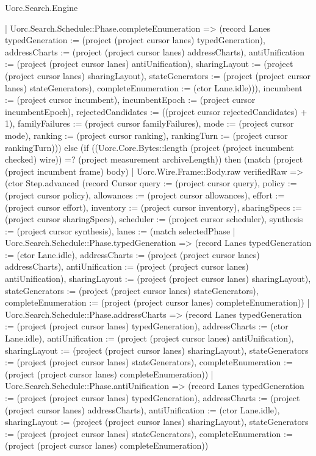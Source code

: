 \begin{lexlean}{Uorc.Search.Engine}
\begin{semanticmodule}
{{          | Uorc.Search.Schedule::Phase.completeEnumeration => (record Lanes {typedGeneration := (project (project cursor lanes) typedGeneration), addressCharts := (project (project cursor lanes) addressCharts), antiUnification := (project (project cursor lanes) antiUnification), sharingLayout := (project (project cursor lanes) sharingLayout), stateGenerators := (project (project cursor lanes) stateGenerators), completeEnumeration := (ctor Lane.idle)})), incumbent := (project cursor incumbent), incumbentEpoch := (project cursor incumbentEpoch), rejectedCandidates := ((project cursor rejectedCandidates) + 1), familyFailures := (project cursor familyFailures), mode := (project cursor mode), ranking := (project cursor ranking), rankingTurn := (project cursor rankingTurn)})) else (if ((Uorc.Core.Bytes::length (project (project incumbent checked) wire)) =? (project measurement archiveLength)) then (match (project (project incumbent frame) body)
          | Uorc.Wire.Frame::Body.raw verifiedRaw => (ctor Step.advanced (record Cursor {query := (project cursor query), policy := (project cursor policy), allowances := (project cursor allowances), effort := (project cursor effort), inventory := (project cursor inventory), sharingSpecs := (project cursor sharingSpecs), scheduler := (project cursor scheduler), synthesis := (project cursor synthesis), lanes := (match selectedPhase
            | Uorc.Search.Schedule::Phase.typedGeneration => (record Lanes {typedGeneration := (ctor Lane.idle), addressCharts := (project (project cursor lanes) addressCharts), antiUnification := (project (project cursor lanes) antiUnification), sharingLayout := (project (project cursor lanes) sharingLayout), stateGenerators := (project (project cursor lanes) stateGenerators), completeEnumeration := (project (project cursor lanes) completeEnumeration)})
            | Uorc.Search.Schedule::Phase.addressCharts => (record Lanes {typedGeneration := (project (project cursor lanes) typedGeneration), addressCharts := (ctor Lane.idle), antiUnification := (project (project cursor lanes) antiUnification), sharingLayout := (project (project cursor lanes) sharingLayout), stateGenerators := (project (project cursor lanes) stateGenerators), completeEnumeration := (project (project cursor lanes) completeEnumeration)})
            | Uorc.Search.Schedule::Phase.antiUnification => (record Lanes {typedGeneration := (project (project cursor lanes) typedGeneration), addressCharts := (project (project cursor lanes) addressCharts), antiUnification := (ctor Lane.idle), sharingLayout := (project (project cursor lanes) sharingLayout), stateGenerators := (project (project cursor lanes) stateGenerators), completeEnumeration := (project (project cursor lanes) completeEnumeration)})
}}
\end{semanticmodule}
\end{lexlean}
